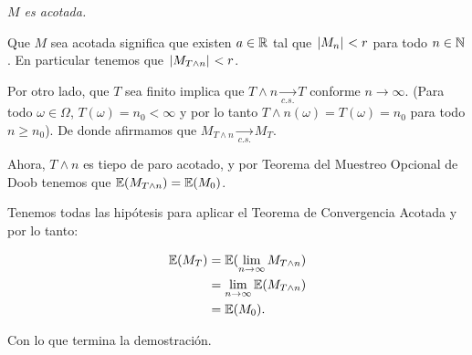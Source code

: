 \emph{
    $M$ es acotada.
}

\afterstatement\par\null

Que $M$ sea acotada significa que existen $a \in  \mathbb{R}$ tal que $\hspace{.25mm}\left|M_n\right|\hspace{.25mm} < r$ para todo $n \in \mathbb{N}$. En particular 
tenemos que $\hspace{.25mm}\left|M_{T \wedge n}\right|\hspace{.25mm} < r$.\par\null

Por otro lado, que $T$ sea finito implica que $T \wedge n  \underset{c.s.}\longrightarrow T$ conforme $n \rightarrow \infty$.
(Para todo $\omega \in \Omega$, $T(\omega) = n_0 < \infty$ y por lo tanto $T \wedge n (\omega) = T(\omega) = n_0$ para todo
$n \geq n_0$). De donde afirmamos que $M_{T \wedge n} \underset{c.s.}\longrightarrow M_T$. \par\null

Ahora, $T \wedge n$ es tiepo de paro acotado, y por Teorema del Muestreo Opcional de Doob tenemos que 
$\mathbb{E}(M_{T \wedge n}) = \mathbb{E}(M_0)$.\par\null

Tenemos todas las hipótesis para aplicar el Teorema de Convergencia Acotada y por lo tanto:

\begin{align}
    \mathbb{E}(M_T)     &=  \mathbb{E}(\lim_{n \rightarrow \infty} M_{T \wedge n})     \\
                &=  \lim_{n \rightarrow \infty} \mathbb{E}(M_{T \wedge n})     \\
                &=  \mathbb{E}(M_0).
\end{align}\par\null

Con lo que termina la demostración.
 